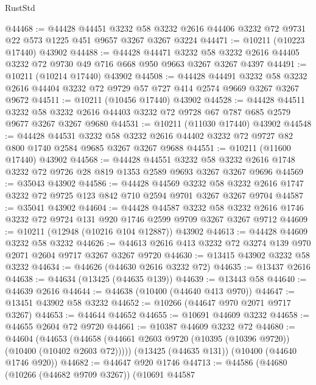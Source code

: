 \begin{lexlean}{RustStd}
\begin{coremodule}
@44468 := @44428
    @44451
    @3232
    @58
    @3232
    @2616
    @44406
    @3232
    @72
    @9731
    @22
    @573
    @1225
    @451
    @9657
    @3267
    @3267
    @3224
@44471 := @10211 (@10223 @17440) @43902
@44488 := @44428
    @44471
    @3232
    @58
    @3232
    @2616
    @44405
    @3232
    @72
    @9730
    @49
    @716
    @668
    @950
    @9663
    @3267
    @3267
    @4397
@44491 := @10211 (@10214 @17440) @43902
@44508 := @44428
    @44491
    @3232
    @58
    @3232
    @2616
    @44404
    @3232
    @72
    @9729
    @57
    @727
    @414
    @2574
    @9669
    @3267
    @3267
    @9672
@44511 := @10211 (@10456 @17440) @43902
@44528 := @44428
    @44511
    @3232
    @58
    @3232
    @2616
    @44403
    @3232
    @72
    @9728
    @67
    @787
    @685
    @2579
    @9677
    @3267
    @3267
    @9680
@44531 := @10211 (@11030 @17440) @43902
@44548 := @44428
    @44531
    @3232
    @58
    @3232
    @2616
    @44402
    @3232
    @72
    @9727
    @82
    @800
    @1740
    @2584
    @9685
    @3267
    @3267
    @9688
@44551 := @10211 (@11600 @17440) @43902
@44568 := @44428
    @44551
    @3232
    @58
    @3232
    @2616
    @1748
    @3232
    @72
    @9726
    @28
    @819
    @1353
    @2589
    @9693
    @3267
    @3267
    @9696
@44569 := @35043 @43902
@44586 := @44428
    @44569
    @3232
    @58
    @3232
    @2616
    @1747
    @3232
    @72
    @9725
    @123
    @842
    @710
    @2594
    @9701
    @3267
    @3267
    @9704
@44587 := @35041 @43902
@44604 := @44428
    @44587
    @3232
    @58
    @3232
    @2616
    @1746
    @3232
    @72
    @9724
    @131
    @920
    @1746
    @2599
    @9709
    @3267
    @3267
    @9712
@44609 := @10211 (@12948 (@10216 @104 @12887)) @43902
@44613 := @44428 @44609 @3232 @58 @3232
@44626 := @44613 @2616 @413 @3232 @72 @3274 @139 @970 @2071 @2604 @9717 @3267 @3267 @9720
@44630 := @13415 @43902 @3232 @58 @3232
@44634 := @44626 (@44630 @2616 @3232 @72)
@44635 := @13437 @2616
@44638 := @44634 (@13425 (@44635 @139))
@44639 := @13443 @58
@44640 := @44639 @2616
@44644 := @44638 (@10400 (@44640 @413 @970))
@44647 := @13451 @43902 @58 @3232
@44652 := @10266 (@44647 @970 @2071 @9717 @3267)
@44653 := @44644 @44652
@44655 := @10691 @44609 @3232
@44658 := @44655 @2604 @72 @9720
@44661 := @10387 @44609 @3232 @72
@44680 := @44604
    (@44653 (@44658 (@44661 @2603 @9720 (@10395 (@10396 @9720)) (@10400 (@10402 @2603 @72)))))
    (@13425 (@44635 @131))
    (@10400 (@44640 @1746 @920))
@44682 := @44647 @920 @1746
@44713 := @44586
    (@44680
      (@10266 (@44682 @9709 @3267))
      (@10691
        @44587

\end{coremodule}
\end{lexlean}
